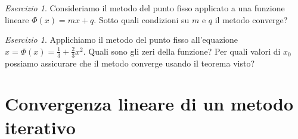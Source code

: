 \documentclass[a4paper]{report}
\theoremstyle{definiton}
\theoremstyle{remark}
\newtheorem{esercizio}[theorem]{Esercizio}
\begin{document}
\begin{esercizio}
    Consideriamo il metodo del punto fisso applicato a una funzione lineare $\Phi(x) = mx + q$. Sotto quali condizioni su $m$ e $q$ il metodo converge?
\end{esercizio}
\begin{esercizio}
    Applichiamo il metodo del punto fisso all'equazione $x = \Phi(x) = \frac13 + \frac23 x^2$. Quali sono gli zeri della funzione? Per quali valori di $x_0$ possiamo assicurare che il metodo converge usando il teorema visto?
\end{esercizio}

\section{Convergenza lineare di un metodo iterativo}
\end{document}
